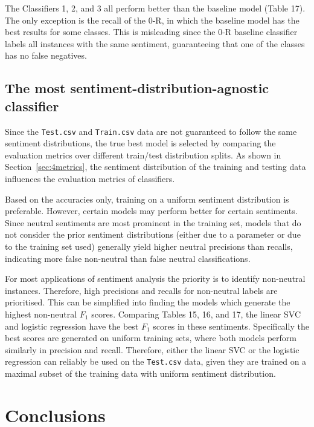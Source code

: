 \documentclass[11pt]{article}
\begin{document}
The Classifiers 1, 2, and 3 all perform better than the baseline model (Table 17). 
The only exception is the recall of the 0-R, in which the baseline model has the best results for some classes.
This is misleading since the 0-R baseline classifier labels all instances with the same sentiment, 
guaranteeing that one of the classes has no false negatives.


\subsection{The most sentiment-distribution-agnostic classifier}\label{sec:agnostic}

Since the \texttt{Test.csv} and \texttt{Train.csv} data are not guaranteed to follow the same sentiment distributions,
the true best model is selected by comparing the evaluation metrics over different train/test distribution splits.
As shown in Section~\ref{sec:4metrics}, the sentiment distribution of the training and testing data influences the evaluation metrics of classifiers.

Based on the accuracies only, training on a uniform sentiment distribution is preferable.
However, certain models may perform better for certain sentiments.
Since neutral sentiments are most prominent in the training set, models that do not consider the prior sentiment distributions 
(either due to a parameter or due to the training set used) generally yield higher neutral precisions than recalls,
indicating more false non-neutral than false neutral classifications.

For most applications of sentiment analysis the priority is to identify non-neutral instances.
Therefore, high precisions and recalls for non-neutral labels are prioritised.
This can be simplified into finding the models which generate the highest non-neutral $F_1$ scores.
Comparing Tables 15, 16, and 17, 
the linear SVC and logistic regression have the best $F_1$ scores in these sentiments.
Specifically the best scores are generated on uniform training sets, where both models perform similarly in precision and recall.
Therefore, either the linear SVC or the logistic regression can reliably be used on the \texttt{Test.csv} data,
given they are trained on a maximal subset of the training data with uniform sentiment distribution.

\pagebreak
\section{Conclusions}
\end{document}
